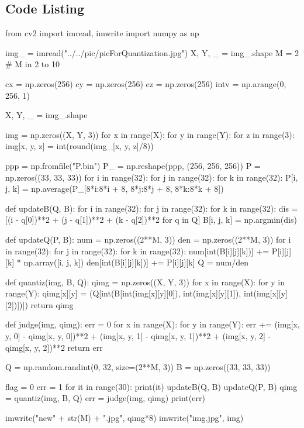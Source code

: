 \documentclass{article}
\begin{document}
\begin{appendices}
\section{Code Listing}
\begin{python}
from cv2 import imread, imwrite
import numpy as np

img_ = imread("../../pic/picForQuantization.jpg")
X, Y, _ = img_.shape
M = 2 # M in 2 to 10

cx = np.zeros(256)
cy = np.zeros(256)
cz = np.zeros(256)
intv = np.arange(0, 256, 1)

X, Y, _ = img_.shape

img = np.zeros((X, Y, 3))
for x in range(X):
    for y in range(Y):
        for z in range(3):
            img[x, y, z] = int(round(img_[x, y, z]/8))

ppp = np.fromfile("P.bin")
P_  = np.reshape(ppp, (256, 256, 256))
P = np.zeros((33, 33, 33))
for i in range(32):
    for j in range(32):
        for k in range(32):
            P[i, j, k] = np.average(P_[8*i:8*i + 8, 8*j:8*j + 8, 8*k:8*k + 8])

def updateB(Q, B):
    for i in range(32):
        for j in range(32):
            for k in range(32):
                dis = [(i - q[0])**2 + (j - q[1])**2 + (k - q[2])**2 for q in Q]
                B[i, j, k] = np.argmin(dis)

def updateQ(P, B):
    num = np.zeros((2**M, 3))
    den = np.zeros((2**M, 3))
    for i in range(32):
        for j in range(32):
            for k in range(32):
                num[int(B[i][j][k])] += P[i][j][k] * np.array([i, j, k])
                den[int(B[i][j][k])] += P[i][j][k]
    Q = num/den

def quantiz(img, B, Q):
    qimg = np.zeros((X, Y, 3))
    for x in range(X):
        for y in range(Y):
            qimg[x][y] = (Q[int(B[int(img[x][y][0]), int(img[x][y][1]), int(img[x][y][2])])])
    return qimg

def judge(img, qimg):
    err = 0
    for x in range(X):
        for y in range(Y):
            err += (img[x, y, 0] - qimg[x, y, 0])**2 + (img[x, y, 1] - qimg[x, y, 1])**2 + (img[x, y, 2] - qimg[x, y, 2])**2
    return err

Q = np.random.randint(0, 32, size=(2**M, 3))
B = np.zeros((33, 33, 33))

flag = 0
err = 1
for it in range(30):
    print(it)
    updateB(Q, B)
    updateQ(P, B)
qimg = quantiz(img, B, Q)
err = judge(img, qimg)
print(err)

imwrite("new" + str(M) + ".jpg", qimg*8)
imwrite("img.jpg", img)
\end{python}
\end{appendices}
\end{document}
